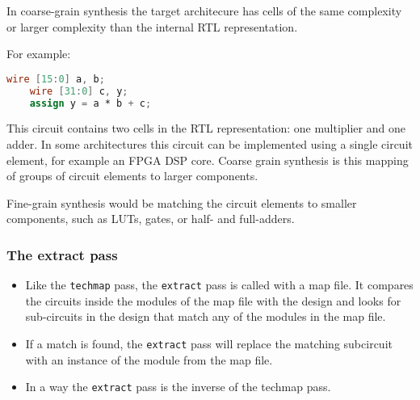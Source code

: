 \begin{frame}[fragile]{\subsubsecname}
In coarse-grain synthesis the target architecure has cells of the same
complexity or larger complexity than the internal RTL representation.

For example:
\begin{lstlisting}[xleftmargin=0.5cm, basicstyle=\ttfamily\fontsize{8pt}{10pt}\selectfont, language=verilog]
	wire [15:0] a, b;
	wire [31:0] c, y;
	assign y = a * b + c;
\end{lstlisting}

This circuit contains two cells in the RTL representation: one multiplier and
one adder. In some architectures this circuit can be implemented using
a single circuit element, for example an FPGA DSP core. Coarse grain synthesis
is this mapping of groups of circuit elements to larger components.

\bigskip
Fine-grain synthesis would be matching the circuit elements to smaller
components, such as LUTs, gates, or half- and full-adders.
\end{frame}

\subsubsection{The extract pass}

\begin{frame}{\subsubsecname}
\begin{itemize}
\item Like the {\tt techmap} pass, the {\tt extract} pass is called with
a map file. It compares the circuits inside the modules of the map file
with the design and looks for sub-circuits in the design that match any
of the modules in the map file.
\bigskip
\item If a match is found, the {\tt extract} pass will replace the matching
subcircuit with an instance of the module from the map file.
\bigskip
\item In a way the {\tt extract} pass is the inverse of the techmap pass.
\end{itemize}
\end{frame}


